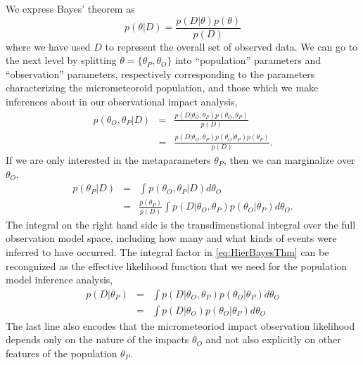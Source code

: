 \documentclass[twocolumn,showpacs,aps,prd,nobibnotes,nofootinbib,floatfix]{revtex4-1}
\begin{document}
We express Bayes' theorem as
\begin{equation}
  p(\theta|D)=\frac{p(D|\theta)p(\theta)}{p(D)}
\end{equation}
where we have used $D$ to represent the overall set of observed data.  We can go to the next level by splitting $\theta=\{\theta_P,\theta_O\}$ into ``population'' parameters and ``observation'' parameters, respectively corresponding to the parameters characterizing the micrometeoroid population, and those which we make inferences about in our observational impact analysis,
\begin{eqnarray*}
  p(\theta_O,\theta_P|D)&=&\frac{p(D|\theta_O,\theta_P)p(\theta_O,\theta_P)}{p(D)}\\
  &=&\frac{p(D|\theta_O,\theta_P)p(\theta_O|\theta_P)p(\theta_P)}{p(D)}.
\end{eqnarray*}
If we are only interested in the metaparameters $\theta_P$, then we can marginalize over $\theta_O$,
\begin{eqnarray}
  p(\theta_P|D)&=&\int p(\theta_O,\theta_P|D)
  d{\theta_O}\nonumber\\
  &=&\frac{ p(\theta_P)}{p(D)}\int p(D|\theta_O,\theta_P)p(\theta_O|\theta_P)d\theta_O.\label{eq:HierBayesThm}
\end{eqnarray} 
The integral on the right hand side is the transdimenstional integral over the full observation model space, including how many and what kinds of events were inferred to have occurred.  The integral factor in \eqref{eq:HierBayesThm} can be recongnized as the effective likelihood function that we need for the population model inference analysis,
\begin{eqnarray}
  p(D|\theta_P)&=&\int p(D|\theta_O,\theta_P)p(\theta_O|\theta_P)d\theta_O\nonumber\\
  &=&\int p(D|\theta_O)p(\theta_O|\theta_P)d\theta_O\label{eq:metaLike}
\end{eqnarray}
The last line also encodes that the micrometeoriod impact observation likelihood depends only on the nature of the impacts $\theta_O$ and not also explicitly on other features of the population $\theta_P$.
\end{document}
